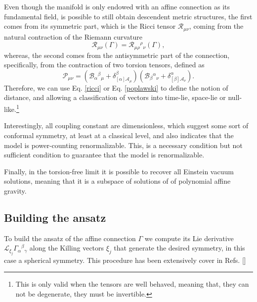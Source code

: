 \documentclass{article}
\providecommand{\ctG}[3]{\Gamma_{#1}{}^{ #2}{}_{#3}}
\providecommand{\B}[3]{\mathcal{B}_{#1}{}^{ #2}{}_{#3}}
\providecommand{\A}[1]{\mathcal{A}_{#1}}
\begin{document}
Even though the manifold is only endowed with an affine connection as its 
fundamental field, is possible to still obtain descendent metric structures, the
first comes from its symmetric part, which is the Ricci tensor $\mathcal{R}_{\mu\nu}$,
coming from the natural contraction of the Riemann curvature
\begin{equation}
    \label{ricci}
    \mathcal{R}_{\mu\nu}\left(\Gamma\right) = \mathcal{R}_{\mu\rho}{}^{\rho}{}_{\nu}\left(\Gamma\right),
\end{equation}
whereas, the second comes from the antisymmetric part of the connection, specifically,
from the contraction of two torsion tensors, defined as
\begin{equation}
    \label{poplawski}
    \mathcal{P}_{\mu\nu} = \left(\B{\alpha}{\beta}{\mu} + \delta^\beta_{[\alpha]\A{\mu}}\right)
    \left(\B{\beta}{\alpha}{\nu} + \delta^\alpha_{[\beta]\A{\nu}}\right).
\end{equation}
Therefore, we can use Eq. \eqref{ricci} or Eq. \eqref{poplawski} to define the notion of 
distance, and allowing a classification of vectors into time-lie, space-lie or null-like.\footnote{
This is only valid when the tensors are well behaved, meaning that, they can not be degenerate,
they must be invertible.}

Interestingly, all coupling constant are dimensionless, which suggest some sort of
conformal symmetry, at least at a classical level, and also indicates that the
model is power-counting renormalizable. This, is a necessary condition but not
sufficient condition to guarantee that the model is renormalizable.

Finally, in the torsion-free limit it is possible to recover all Einstein vacuum solutions,
meaning that it is a subspace of solutions of of polynomial affine gravity.

\subsection{Building the ansatz}

To build the ansatz of the affine connection $\Gamma$ we compute its Lie derivative 
$\mathcal{L}_{\xi_j}\ctG{\alpha}{\beta}{\gamma}$ along the Killing vectors $\xi_j$ that 
generate the desired symmetry, in this case a spherical symmetry. This procedure
has been extensively cover in Refs. [] 
\end{document}
